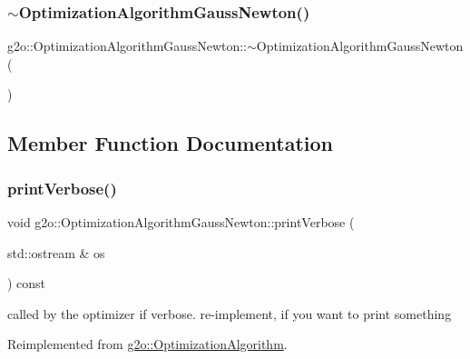 \subsubsection{\texorpdfstring{$\sim$\+Optimization\+Algorithm\+Gauss\+Newton()}{~OptimizationAlgorithmGaussNewton()}}
{\footnotesize\ttfamily g2o\+::\+Optimization\+Algorithm\+Gauss\+Newton\+::$\sim$\+Optimization\+Algorithm\+Gauss\+Newton (\begin{DoxyParamCaption}{ }\end{DoxyParamCaption})\hspace{0.3cm}{\ttfamily [virtual]}}



\subsection{Member Function Documentation}
\mbox{\label{classg2o_1_1_optimization_algorithm_gauss_newton_aff4c1b6a9f8a2e5c6777cfef9d4a18ba}} 
\subsubsection{\texorpdfstring{print\+Verbose()}{printVerbose()}}
{\footnotesize\ttfamily void g2o\+::\+Optimization\+Algorithm\+Gauss\+Newton\+::print\+Verbose (\begin{DoxyParamCaption}\item[{std\+::ostream \&}]{os }\end{DoxyParamCaption}) const\hspace{0.3cm}{\ttfamily [virtual]}}

called by the optimizer if verbose. re-\/implement, if you want to print something 

Reimplemented from \mbox{\hyperlink{classg2o_1_1_optimization_algorithm_a6683d35e67402b50924bc4744b6e282a}{g2o\+::\+Optimization\+Algorithm}}.

\mbox{\label{classg2o_1_1_optimization_algorithm_gauss_newton_aba0b67eecaca01c576de7e605e5af5f1}} 

